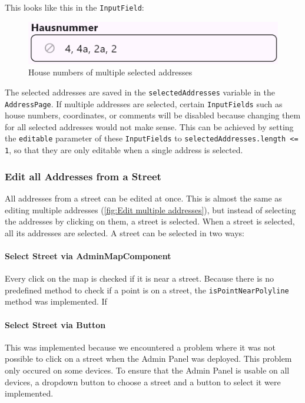 This looks like this in the \texttt{InputField}:
\begin{figure}[H]
    \centering
    \includegraphics[width=0.6\linewidth]{images/AdminPanel/listedHouseNumbersInputField.png}
    \caption{House numbers of multiple selected addresses}
\end{figure}

The selected addresses are saved in the \texttt{selectedAddresses} variable in the \texttt{AddressPage}. If multiple addresses are selected, certain \texttt{InputFields} such as house numbers, coordinates, or comments will be disabled because changing them for all selected addresses would not make sense. This can be achieved by setting the \texttt{editable} parameter of these \texttt{InputFields} to \texttt{selectedAddresses.length <= 1}, so that they are only editable when a single address is selected.\\

\subsubsection{Edit all Addresses from a Street}
All addresses from a street can be edited at once. This is almost the same as editing multiple addresses (\ref{fig:Edit multiple addresses}), but instead of selecting the addresses by clicking on them, a street is selected. When a street is selected, all its addresses are selected. A street can be selected in two ways:

\paragraph{Select Street via AdminMapComponent}
Every click on the map is checked if it is near a street. Because there is no predefined method to check if a point is on a street, the \texttt{isPointNearPolyline} method was implemented. If 

\paragraph{Select Street via Button}
This was implemented because we encountered a problem where it was not possible to click on a street when the Admin Panel was deployed. This problem only occured on some devices. To ensure that the Admin Panel is usable on all devices, a dropdown button to choose a street and a button to select it were implemented.\\

